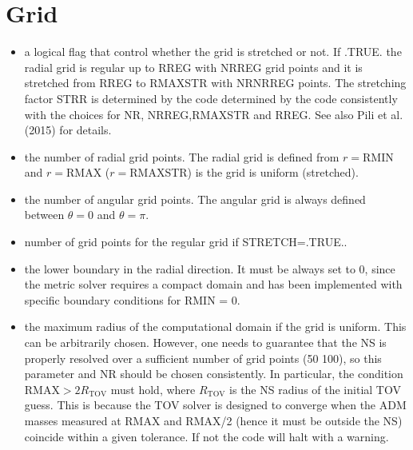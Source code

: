 \documentclass[letterpaper,10pt,english]{sphinxmanual}
\begin{document}
\section{Grid}
\label{\detokenize{user_params:grid}}\begin{itemize}
\item {} 
\sphinxAtStartPar
{} \sphinxhyphen{} a logical flag that control whether the grid is stretched or not. If .TRUE. the radial grid
is regular up to RREG with NRREG grid points and it is stretched from RREG to RMAXSTR with NR\sphinxhyphen{}NRREG
points. The stretching factor STRR is determined by the code determined by the code consistently with
the choices for NR, NRREG,RMAXSTR and RREG. See also Pili et al. (2015) for details.

\item {} 
\sphinxAtStartPar
{} \sphinxhyphen{} the number of radial grid points. The radial grid is defined from \(r=\)RMIN and \(r=\)RMAX (\(r=\)RMAXSTR) is the grid is uniform (stretched).


\item {} 
\sphinxAtStartPar
{} \sphinxhyphen{} the number of angular grid points. The angular grid is always defined between \(\theta = 0\) and \(\theta = \pi\).


\item {} 
\sphinxAtStartPar
{} \sphinxhyphen{} number of grid points for the regular grid if STRETCH=.TRUE..


\item {} 
\sphinxAtStartPar
{} \sphinxhyphen{} the lower boundary in the radial direction. It must be always set to 0, since the metric solver
requires a compact domain and has been implemented with specific boundary conditions for RMIN = 0.


\item {} 
\sphinxAtStartPar
{} \sphinxhyphen{} the maximum radius of the computational domain if the grid is uniform. This can be arbitrarily chosen. However,
one needs to guarantee that the NS is properly resolved over a sufficient number of grid points (50\sphinxhyphen{}
100), so this parameter and NR should be chosen consistently. In particular, the condition RMAX\( >
2R_\mathrm{TOV}\) must hold, where \(R_\mathrm{TOV}\) is the NS radius of the initial TOV guess. This is because the TOV
solver is designed to converge when the ADM masses measured at RMAX and RMAX/2 (hence it must
be outside the NS) coincide within a given tolerance. If not the code will halt with a warning.



\end{itemize}
\end{document}
